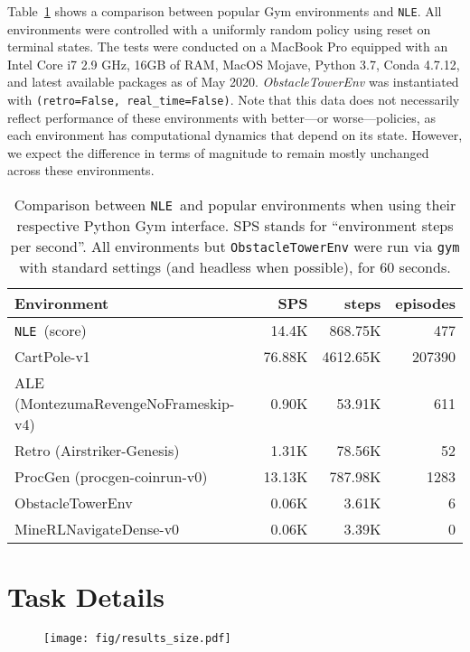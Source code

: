 \documentclass{article}
\newcommand{\NLE}{\texttt{NLE}}
\begin{document}
Table~\ref{table:envscomparison} shows a comparison between popular Gym
environments and \NLE{}.
All environments were controlled with a
uniformly random policy using reset on terminal states.
The tests were conducted on a MacBook
Pro equipped with an Intel Core i7 2.9 GHz, 16GB of RAM, MacOS Mojave,
Python 3.7, Conda 4.7.12, and latest available packages as of May
2020. \emph{ObstacleTowerEnv} was instantiated with \texttt{(retro=False, real\_time=False)}. Note that this data does not necessarily reflect performance of these environments with better---or worse---policies, as each environment has computational dynamics that depend on its state. However, we expect the difference in terms of magnitude to remain mostly unchanged across these environments.
\begin{table}[h]
\centering
\caption{Comparison between \NLE\ and popular environments when
   using their respective Python Gym interface. SPS stands for ``environment steps per
  second''. All environments but \texttt{ObstacleTowerEnv} were run via \texttt{gym} with standard settings (and headless when possible), for $60$ seconds.\\}
\label{table:envscomparison}
\begin{tabular}{lrrr}
\toprule
Environment &    SPS &     steps & episodes \\
\midrule
                        \NLE\ (score)   &  14.4K &   868.75K &      477 \\
                          CartPole-v1   & 76.88K &  4612.65K &   207390 \\
 ALE (MontezumaRevengeNoFrameskip-v4)   &  0.90K &    53.91K &      611 \\
          Retro (Airstriker-Genesis)    &  1.31K &    78.56K &       52 \\
           ProcGen (procgen-coinrun-v0) & 13.13K &   787.98K &     1283 \\
                     ObstacleTowerEnv   &  0.06K &     3.61K &        6 \\
               MineRLNavigateDense-v0   &  0.06K &     3.39K &        0 \\
\bottomrule
\end{tabular}

\end{table}







\section{Task Details}
\label{sec:taskdetails}
\begin{figure}
  \centering
  \texttt{[image: fig/results\_size.pdf]}
  \label{fig:results_size}
\end{figure}
\end{document}
